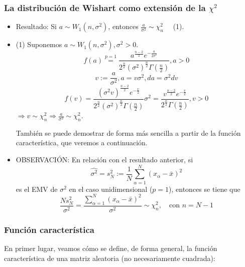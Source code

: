 \documentclass[11pt,a4paper]{article}
\begin{document}
\subsubsection{La distribución de Wishart como extensión de la \texorpdfstring{$\chi^{2}$})}
\begin{itemize}
\item Resultado: Si $a \sim W_{1}(n, \sigma^{2})$, entonces $\frac{a}{\sigma^{2}} \sim \chi_{n}^{2} \quad$ (1).

\item (1) Suponemos $a \sim W_{1}(n, \sigma^{2}), \sigma^{2} > 0$.
$$f(a) \overset{p=1}{=} \frac{a^{\frac{n-2}{2}}e^{-\frac{a}{2\sigma^{2}}}}{2^{\frac{n}{2}}(\sigma^{2})^{\frac{n}{2}}\Gamma(\frac{n}{2})}, a > 0$$
$$v := \frac{a}{\sigma^{2}}, a = v\sigma^{2}, da = \sigma^{2}dv$$
$$f(v) = \frac{(\sigma^{2}v)^{\frac{n-2}{2}} e^{-\frac{v}{2}}}{2^{\frac{n}{2}}(\sigma^{2})^{\frac{n}{2}}\Gamma(\frac{n}{2})}\sigma^{2} = \frac{v^{\frac{n-2}{2}}e^{-\frac{v}{2}}}{2^{\frac{n}{2}}\Gamma(\frac{n}{2})}, v > 0$$
$\Rightarrow v \sim \chi_{n}^{2} \Rightarrow \frac{a}{\sigma^{2}} \sim \chi_{n}^{2}$.

También se puede demostrar de forma más sencilla a partir de la función característica, que veremos a continuación.

\item OBSERVACIÓN: En relación con el resultado anterior, si
$$\hat{\sigma^{2}} = s_{N}^{2} := \frac{1}{N} \sum_{\alpha=1}^{N}(x_{\alpha} - \bar{x})^{2}$$
es el EMV de $\sigma^{2}$ en el caso unidimensional ($p=1$), entonces se tiene que
$$\frac{Ns_{N}^{2}}{\sigma^{2}} = \frac{\sum_{\alpha=1}^{N}(x_{\alpha} - \bar{x})^{2}}{\sigma^{2}} \sim \chi_{n}^{2}, \quad \text{con } n=N-1$$
\end{itemize}

\subsubsection{Función característica}
En primer lugar, veamos cómo se define, de forma general, la función característica de una matriz aleatoria (no necesariamente cuadrada):
\end{document}
